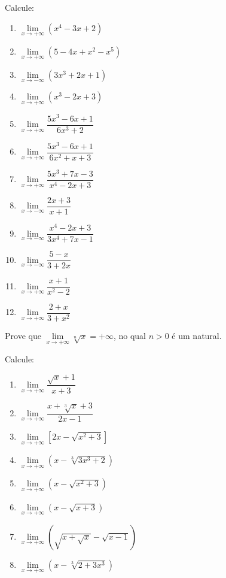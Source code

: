 \begin{exercicio}[1]
Calcule:
\begin{enumerate}[label=\alph*)]
    \item $\lim\limits_{x \to +\infty} (x^4 - 3x + 2)$
    \item $\lim\limits_{x \to +\infty} (5 - 4x + x^2 - x^5)$
    \item $\lim\limits_{x \to -\infty} (3x^3 + 2x + 1)$
    \item $\lim\limits_{x \to +\infty} (x^3 - 2x + 3)$
    \item $\lim\limits_{x \to +\infty} \dfrac{5x^3 - 6x + 1}{6x^3 + 2}$
    \item $\lim\limits_{x \to +\infty} \dfrac{5x^3 - 6x + 1}{6x^2 + x + 3}$
    \item $\lim\limits_{x \to +\infty} \dfrac{5x^3 + 7x - 3}{x^4 - 2x + 3}$
    \item $\lim\limits_{x \to -\infty} \dfrac{2x + 3}{x + 1}$
    \item $\lim\limits_{x \to -\infty} \dfrac{x^4 - 2x + 3}{3x^4 + 7x - 1}$
    \item $\lim\limits_{x \to -\infty} \dfrac{5 - x}{3 + 2x}$
    \item $\lim\limits_{x \to +\infty} \dfrac{x + 1}{x^2 - 2}$
    \item $\lim\limits_{x \to +\infty} \dfrac{2 + x}{3 + x^2}$
\end{enumerate}
\end{exercicio}

\begin{exercicio}[2]
Prove que $\lim\limits_{x \to +\infty} \sqrt[n]{x} = +\infty$, no qual $n > 0$ é um natural.
\end{exercicio}

\begin{exercicio}[3]
Calcule:
\begin{enumerate}[label=\alph*)]
    \item $\lim\limits_{x \to +\infty} \dfrac{\sqrt{x} + 1}{x + 3}$
    \item $\lim\limits_{x \to +\infty} \dfrac{x + \sqrt[3]{x} + 3}{2x - 1}$
    \item $\lim\limits_{x \to +\infty} [2x - \sqrt{x^2 + 3}]$
    \item $\lim\limits_{x \to +\infty} (x - \sqrt[3]{3x^3 + 2})$
    \item $\lim\limits_{x \to +\infty} (x - \sqrt{x^2 + 3})$
    \item $\lim\limits_{x \to +\infty} (x - \sqrt{x + 3})$
    \item $\lim\limits_{x \to +\infty} (\sqrt{x + \sqrt{x}} - \sqrt{x - 1})$
    \item $\lim\limits_{x \to +\infty} (x - \sqrt[3]{2 + 3x^3})$
\end{enumerate}
\end{exercicio}

